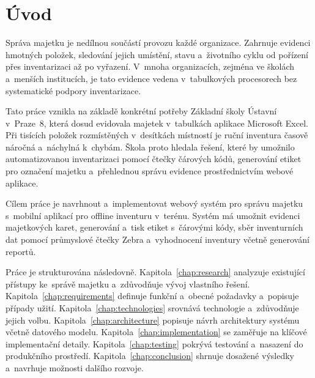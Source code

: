 \chapter{Úvod}
\setcounter{page}{1}

Správa majetku je nedílnou součástí provozu každé organizace. Zahrnuje evidenci hmotných položek, sledování jejich umístění, stavu a~životního cyklu od pořízení přes inventarizaci až po vyřazení. V~mnoha organizacích, zejména ve školách a~menších institucích, je tato evidence vedena v~tabulkových procesorech bez systematické podpory inventarizace.

Tato práce vznikla na základě konkrétní potřeby Základní školy Ústavní v~Praze~8, která dosud evidovala majetek v~tabulkách aplikace Microsoft Excel. Při tisících položek rozmístěných v~desítkách místností je ruční inventura časově náročná a~náchylná k~chybám. Škola proto hledala řešení, které by umožnilo automatizovanou inventarizaci pomocí čtečky čárových kódů, generování etiket pro označení majetku a~přehlednou správu evidence prostřednictvím webové aplikace.

Cílem práce je navrhnout a~implementovat webový systém pro správu majetku s~mobilní aplikací pro offline inventuru v~terénu. Systém má umožnit evidenci majetkových karet, generování a~tisk etiket s~čárovými kódy, sběr inventurních dat pomocí průmyslové čtečky Zebra a~vyhodnocení inventury včetně generování reportů.

\medskip

Práce je strukturována následovně. Kapitola~\ref{chap:research} analyzuje existující přístupy ke~správě majetku a~zdůvodňuje vývoj vlastního řešení. Kapitola~\ref{chap:requirements} definuje funkční a~obecné požadavky a~popisuje případy užití. Kapitola~\ref{chap:technologies} srovnává technologie a~zdůvodňuje jejich volbu. Kapitola~\ref{chap:architecture} popisuje návrh architektury systému včetně datového modelu. Kapitola~\ref{chap:implementation} se zaměřuje na klíčové implementační detaily. Kapitola~\ref{chap:testing} pokrývá testování a~nasazení do produkčního prostředí. Kapitola~\ref{chap:conclusion} shrnuje dosažené výsledky a~navrhuje možnosti dalšího rozvoje.


